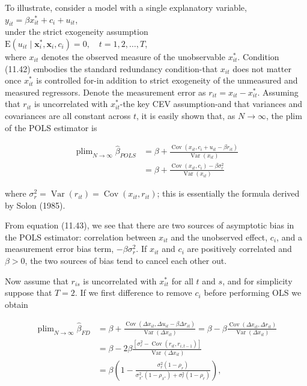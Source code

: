 \documentclass[10pt]{article}
\begin{document}
To illustrate, consider a model with a single explanatory variable,\\
$y_{i t}=\beta x_{i t}^{*}+c_{i}+u_{i t}$,\\
under the strict exogeneity assumption\\
$\mathrm{E}\left(u_{i t} \mid \mathbf{x}_{i}^{*}, \mathbf{x}_{i}, c_{i}\right)=0, \quad t=1,2, \ldots, T$,\\
where $x_{i t}$ denotes the observed measure of the unobservable $x_{i t}^{*}$. Condition (11.42) embodies the standard redundancy condition-that $x_{i t}$ does not matter once $x_{i t}^{*}$ is controlled for-in addition to strict exogeneity of the unmeasured and measured regressors. Denote the measurement error as $r_{i t}=x_{i t}-x_{i t}^{*}$. Assuming that $r_{i t}$ is uncorrelated with $x_{i t}^{*}$-the key CEV assumption-and that variances and covariances are all constant across $t$, it is easily shown that, as $N \rightarrow \infty$, the plim of the POLS estimator is


\begin{align*}
\operatorname{plim}_{N \rightarrow \infty} \hat{\beta}_{P O L S} & =\beta+\frac{\operatorname{Cov}\left(x_{i t}, c_{i}+u_{i t}-\beta r_{i t}\right)}{\operatorname{Var}\left(x_{i t}\right)} \\
& =\beta+\frac{\operatorname{Cov}\left(x_{i t}, c_{i}\right)-\beta \sigma_{r}^{2}}{\operatorname{Var}\left(x_{i t}\right)} \tag{11.43}
\end{align*}


where $\sigma_{r}^{2}=\operatorname{Var}\left(r_{i t}\right)=\operatorname{Cov}\left(x_{i t}, r_{i t}\right)$; this is essentially the formula derived by Solon (1985).

From equation (11.43), we see that there are two sources of asymptotic bias in the POLS estimator: correlation between $x_{i t}$ and the unobserved effect, $c_{i}$, and a measurement error bias term, $-\beta \sigma_{r}^{2}$. If $x_{i t}$ and $c_{i}$ are positively correlated and $\beta>0$, the two sources of bias tend to cancel each other out.

Now assume that $r_{i s}$ is uncorrelated with $x_{i t}^{*}$ for all $t$ and $s$, and for simplicity suppose that $T=2$. If we first difference to remove $c_{i}$ before performing OLS we obtain


\begin{align*}
\operatorname{plim}_{N \rightarrow \infty} \hat{\beta}_{F D} & =\beta+\frac{\operatorname{Cov}\left(\Delta x_{i t}, \Delta u_{i t}-\beta \Delta r_{i t}\right)}{\operatorname{Var}\left(\Delta x_{i t}\right)}=\beta-\beta \frac{\operatorname{Cov}\left(\Delta x_{i t}, \Delta r_{i t}\right)}{\operatorname{Var}\left(\Delta x_{i t}\right)} \\
& =\beta-2 \beta \frac{\left[\sigma_{r}^{2}-\operatorname{Cov}\left(r_{i t}, r_{i, t-1}\right)\right]}{\operatorname{Var}\left(\Delta x_{i t}\right)} \\
& =\beta\left(1-\frac{\sigma_{r}^{2}\left(1-\rho_{r}\right)}{\sigma_{x^{*}}^{2}\left(1-\rho_{x^{*}}\right)+\sigma_{r}^{2}\left(1-\rho_{r}\right)}\right), \tag{11.44}
\end{align*}
\end{document}
